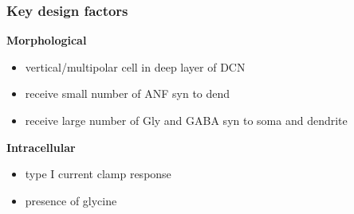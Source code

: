
\subsubsection{Key design factors}


\textbf{Morphological}
\begin{itemize}
\item vertical/multipolar cell in deep layer of DCN \citep{Rhode:1999}
\item receive small number of ANF syn to dend
\item receive large number of Gly and GABA syn to soma and dendrite
\end{itemize}

\textbf{Intracellular}
\begin{itemize}
\item type I current clamp response
\item presence of glycine \citep{OertelWickesberg:1993}
\end{itemize}



